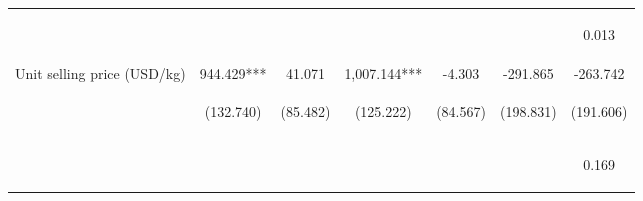 \begin{center}
\begin{tabular}{lcccccc}
\vspace{4pt} & \begin{footnotesize}[0.029]\end{footnotesize} & \begin{footnotesize}[0.420]\end{footnotesize} & \begin{footnotesize}[0.142]\end{footnotesize} & \begin{footnotesize}[0.091]\end{footnotesize} & \begin{footnotesize}[0.006]\end{footnotesize} & \begin{footnotesize}0.013\end{footnotesize} \\
Unit selling price (USD/kg) & 944.429*** & 41.071 & 1,007.144*** & -4.303 & -291.865 & -263.742 \\
 & \begin{footnotesize}(132.740)\end{footnotesize} & \begin{footnotesize}(85.482)\end{footnotesize} & \begin{footnotesize}(125.222)\end{footnotesize} & \begin{footnotesize}(84.567)\end{footnotesize} & \begin{footnotesize}(198.831)\end{footnotesize} & \begin{footnotesize}(191.606)\end{footnotesize} \\
\vspace{4pt} & \begin{footnotesize}[0.000]\end{footnotesize} & \begin{footnotesize}[0.631]\end{footnotesize} & \begin{footnotesize}[0.000]\end{footnotesize} & \begin{footnotesize}[0.959]\end{footnotesize} & \begin{footnotesize}[0.142]\end{footnotesize} & \begin{footnotesize}0.169\end{footnotesize} \\

\end{tabular}
\end{center}
